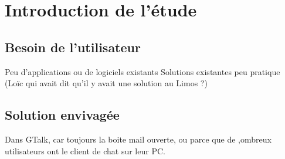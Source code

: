 \cleardoublepage



\chapter{Introduction de l'étude}


\section{Besoin de l'utilisateur}

Peu d'applications ou de logiciels existants
Solutions existantes peu pratique (Loïc qui avait dit qu'il y avait une solution au Limos ?)
\\






\section{Solution envivagée}

Dans GTalk, car toujours la boite mail ouverte, ou parce que de ,ombreux utilisateurs ont le client de chat sur leur PC.
\\
